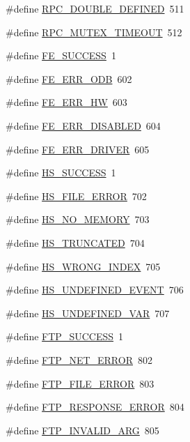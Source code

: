 \begin{DoxyCompactItemize}
\item 
\#define \hyperlink{group__err25_ga68d214e584f6bcd6e91f25f1b9d79f54}{RPC\_\-DOUBLE\_\-DEFINED}~511
\item 
\#define \hyperlink{group__err25_gab7747c8b74d827488058ef9a0f9d3fc5}{RPC\_\-MUTEX\_\-TIMEOUT}~512
\item 
\#define \hyperlink{group__err26_ga23395a243c74edd61ed4ce0df1256419}{FE\_\-SUCCESS}~1
\item 
\#define \hyperlink{group__err26_ga8a0cc5de6ea758c61231a11b6a076e1f}{FE\_\-ERR\_\-ODB}~602
\item 
\#define \hyperlink{group__err26_ga9fea053c26a278026fa0d7501c300c4f}{FE\_\-ERR\_\-HW}~603
\item 
\#define \hyperlink{group__err26_gae7f0996583000c6c16916cdc846b753a}{FE\_\-ERR\_\-DISABLED}~604
\item 
\#define \hyperlink{group__err26_gac4221d7e494c798f57552f502e2459ef}{FE\_\-ERR\_\-DRIVER}~605
\item 
\#define \hyperlink{group__err26_ga2d533509db8628a7e0eb794e2b3e77b0}{HS\_\-SUCCESS}~1
\item 
\#define \hyperlink{group__err26_ga564032fce62ccc4689bd3b5864ad0f9c}{HS\_\-FILE\_\-ERROR}~702
\item 
\#define \hyperlink{group__err26_ga8d2556d6b5d8902646a36e3aa7e71dc5}{HS\_\-NO\_\-MEMORY}~703
\item 
\#define \hyperlink{group__err26_ga8b8cfc047a951f9afe9f833484d7e814}{HS\_\-TRUNCATED}~704
\item 
\#define \hyperlink{group__err26_gab8c5289d12d853f0d8266cdf37c39b08}{HS\_\-WRONG\_\-INDEX}~705
\item 
\#define \hyperlink{group__err26_gad7b85d13f7ee77c6d195ed38380bbc27}{HS\_\-UNDEFINED\_\-EVENT}~706
\item 
\#define \hyperlink{group__err26_ga1b25c77e3145468cf83f8e88bf1e0804}{HS\_\-UNDEFINED\_\-VAR}~707
\item 
\#define \hyperlink{group__err26_ga608032c83acbacc7557d2d04b9ad9a8b}{FTP\_\-SUCCESS}~1
\item 
\#define \hyperlink{group__err26_gaad8d88aaaaaa3706732a8a5aa00a6723}{FTP\_\-NET\_\-ERROR}~802
\item 
\#define \hyperlink{group__err26_ga8f62a67a3788241e74228be45c8d1334}{FTP\_\-FILE\_\-ERROR}~803
\item 
\#define \hyperlink{group__err26_ga7f2618f2babfbc3f2fbd27523c218a1e}{FTP\_\-RESPONSE\_\-ERROR}~804
\item 
\#define \hyperlink{group__err26_ga96fa3686e25d0b43ec2c504cc831551d}{FTP\_\-INVALID\_\-ARG}~805

\end{DoxyCompactItemize}

